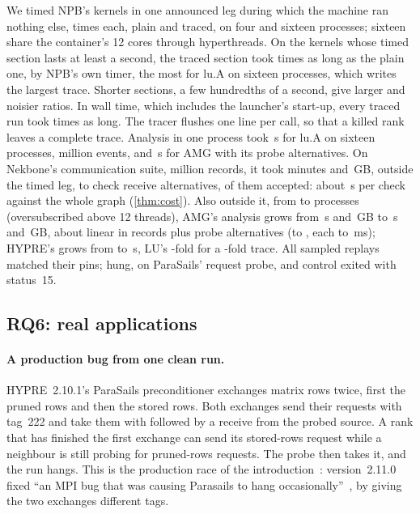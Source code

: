 We timed NPB's kernels in one announced leg during which the machine ran nothing else,
\nEfourReps times each, plain and traced, on four and sixteen processes; sixteen share the
container's 12 cores through hyperthreads. On the kernels whose timed section lasts at least a second, the
traced section took \TraceOverhead times as long as the plain one, by NPB's own timer, the most
for lu.A on sixteen processes, which writes the largest trace. Shorter sections, a few
hundredths of a second, give larger and noisier ratios. In wall time, which includes the
launcher's start-up, every traced run took \TraceOverheadWall times as long.
The tracer flushes one line per call, so that a killed rank leaves a complete trace.
Analysis in one process took \LuAnalysis\,s for lu.A on sixteen processes, \LuEvents million
events, and \AMGtime\,s for AMG with its \nAMGalts probe alternatives. On Nekbone's
communication suite, \NekRecords million records, it took \NekMinutes minutes and \NekGB\,GB,
outside the timed leg, to check \nNekChecked receive alternatives, \nNekAlts of them accepted:
about \NekPerAlt\,s per check against the whole graph (\cref{thm:cost}).
Also outside it, from \nScaleNpMin to \nScaleNpMax processes (oversubscribed above 12
threads), AMG's analysis grows from \ScaleAMGSixteenTime\,s and \ScaleAMGSixteenGB\,GB to
\ScaleAMGSixtyFourTime\,s and \ScaleAMGSixtyFourGB\,GB, about linear in records plus probe alternatives
(\nScaleAMGSixteenProbeAlts to \nScaleAMGSixtyFourProbeAlts, each \ScaleAMGSixteenPerAlt to
\ScaleAMGSixtyFourPerAlt\,ms); HYPRE's grows from \ScaleHypreSixteenTime to \ScaleHypreSixtyFourTime\,s,
LU's \ScaleLuTimeRatio-fold for a \ScaleLuRecordsRatio-fold trace. All \nScaleSample sampled replays
matched their pins; \nScaleSampleUnfinished hung, on ParaSails' request probe, and
\nScaleSampleControlsFailed control exited with status~15.

\subsection{RQ6: real applications}

\paragraph{A production bug from one clean run.} HYPRE~2.10.1's ParaSails preconditioner
exchanges matrix rows twice, first the pruned rows and then the stored rows. Both exchanges
send their requests with tag~222 and take them with 
followed by a receive from the probed source. A rank that has finished the first exchange can
send its stored-rows request while a neighbour is still probing for pruned-rows requests. The
probe then takes it, and the run hangs. This is the production race of the
introduction~\citep{sato17ninja}: version~2.11.0 fixed ``an MPI bug that was causing Parasails to
hang occasionally''~\citep{hypre-changelog}, by giving the two exchanges different tags.

